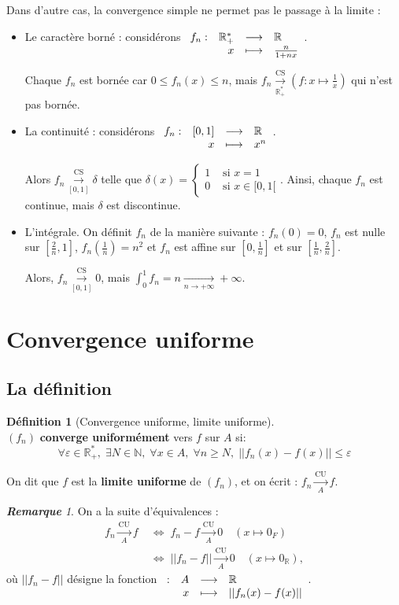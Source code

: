 \documentclass[12pt]{book}
\let\ensembleNombre\mathbb
\newcommand*\N{\ensuremath{\ensembleNombre{N}}}
\newcommand*\R{\ensuremath{\ensembleNombre{R}}}
\newcommand{\app}[5]{\ensuremath{
\begin{array}[t]{lrcl}
#1 : & #2 & \longrightarrow & #3 \\
    & #4 & \longmapsto & #5 \end{array}
}}
\newcommand{\limite}[2]{\ensuremath{\underset{#1 \to #2}{\longrightarrow}}}
\newcommand{\ls}[1]{\ensuremath{\overset{\mathrm{CS}}{\underset{#1}{\longrightarrow}}}}
\newcommand{\lu}[1]{\ensuremath{\overset{\mathrm{CU}}{\underset{#1}{\longrightarrow}}}}
\theoremstyle{definition}
\newtheorem*{defi}{Définition}
\theoremstyle{remark}
\newtheorem*{rem}{\textbf{Remarque}}
\newenvironment{fdef}
  {\begin{mdframed}[roundcorner=10pt, linewidth=1pt]\begin{defi}}
  {\end{defi}\end{mdframed}}
\begin{document}
	\noindent Dans d'autre cas, la convergence simple ne permet pas le passage à la limite :
	\begin{itemize}
	\item Le caractère borné : considérons $\app{f_n}{\R_+^*}{\R}{x}{\frac{n}{1+nx}}$.
	
	Chaque $f_n$ est bornée car $0 \leq f_n(x) \leq n$, mais $f_n \ls{\R_+^*} \left( f : x \longmapsto \frac{1}{x} \right)$ qui n'est pas bornée.
	
	\item La continuité : considérons $\app{f_n}{[0,1]}{\R}{x}{x^n}$.
	
	Alors $f_n \ls{[0,1]} \delta$ telle que $\delta(x) = \begin{cases}
														 1 &\text{ si } x = 1\\
														 0 &\text{ si } x \in [0,1[
														 \end{cases}$.
	Ainsi, chaque $f_n$ est continue, mais $\delta$ est discontinue.
	
	\item L'intégrale. On définit $f_n$ de la manière suivante : $f_n(0) = 0$, $f_n$ est nulle sur $\left[ \frac{2}{n}, 1 \right]$, $f_n \left( \frac{1}{n} \right) = n^2$ et $f_n$ est affine sur $\left[ 0, \frac{1}{n} \right]$ et sur $\left[ \frac{1}{n}, \frac{2}{n} \right]$. 
	
	Alors, $f_n \ls{[0,1]} 0$, mais $\int_0^1 f_n = n \limite{n}{+\infty} +\infty$.
	\end{itemize}
		
	\section{Convergence uniforme}
		\subsection{La définition}
	\begin{fdef}[Convergence uniforme, limite uniforme]\mbox{~}\\
	$(f_n)$ \textbf{converge uniformément} vers $f$ sur $A$ si:
	\[ \forall \varepsilon \in \R_+^*,\; \exists N \in \N, \; \forall x \in A,\; \forall n\geq N, \; ||f_n(x) - f(x) || \leq \varepsilon \]
	
	\noindent On dit que $f$ est la \textbf{limite uniforme} de $(f_n)$, et on écrit : $f_n \lu{A} f$.
	\end{fdef}
	
	\begin{rem}
	On a la suite d'équivalences :
	\begin{align*}
	f_n \lu{A} f \; &\Longleftrightarrow\; f_n - f \lu{A} 0 \quad (x \mapsto 0_F)\\
	&\Longleftrightarrow\; ||f_n - f|| \lu{A} 0 \quad (x \mapsto 0_\R),
	\end{align*}
	où $||f_n - f||$ désigne la fonction $\app{}{A}{\R}{x}{||f_n(x) - f(x)||}$.
	\end{rem}
	
\end{document}
